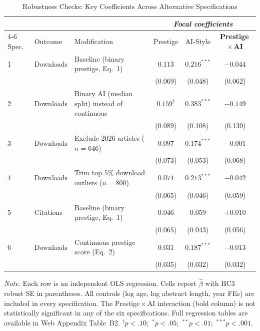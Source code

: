 \documentclass[12pt,a4paper]{article}
\begin{document}
\begin{table}[htbp]
\centering
\caption{Robustness Checks: Key Coefficients Across Alternative Specifications}
\label{tab:robustness}
\begin{threeparttable}
\small
\begin{tabular}{llp{4.2cm}ccc}
\toprule
 & & & \multicolumn{3}{c}{\textit{Focal coefficients}} \\
\cmidrule(lr){4-6}
Spec. & Outcome & Modification
  & Prestige & AI-Style & \textbf{Prestige\,$\times$\,AI} \\
\midrule
1 & Downloads & Baseline (binary prestige, Eq.~1)
  & $0.113$ & $0.216^{***}$  & $-0.044$ \\
  &           &
  & (0.069) & (0.048)        & (0.062)  \\[4pt]
2 & Downloads & Binary AI (median split) instead of continuous
  & $0.159^{\dagger}$ & $0.383^{***}$ & $-0.149$  \\
  &           &
  & (0.089)           & (0.108)       & (0.139)  \\[4pt]
3 & Downloads & Exclude 2026 articles ($n = 646$)
  & $0.097$ & $0.174^{***}$  & $-0.001$ \\
  &           &
  & (0.073) & (0.053)        & (0.068)  \\[4pt]
4 & Downloads & Trim top 5\% download outliers ($n=800$)
  & $0.074$ & $0.213^{***}$  & $-0.042$ \\
  &           &
  & (0.065) & (0.046)        & (0.059)  \\[4pt]
5 & Citations & Baseline (binary prestige, Eq.~1)
  & $0.046$  & $0.059$  & $+0.010$ \\
  &           &
  & (0.065)  & (0.043)  & (0.056)  \\[4pt]
6 & Downloads & Continuous prestige score (Eq.~2)
  & $0.031$ & $0.187^{***}$ & $-0.013$ \\
  &           &
  & (0.035) & (0.032)       & (0.032)  \\[4pt]
\bottomrule
\end{tabular}
\begin{tablenotes}
\footnotesize
\item \textit{Note.} Each row is an independent OLS regression.
  Cells report $\hat{\beta}$ with HC3 robust SE in parentheses.
  All controls (log age, log abstract length, year FEs)
  are included in every specification.
  The Prestige\,$\times$\,AI interaction (bold column) is not statistically
  significant in any of the six specifications.
  Full regression tables are available in Web Appendix Table~B2.
  $^{\dagger}p<.10$;\ $^{*}p<.05$;\ $^{**}p<.01$;\ $^{***}p<.001$.
\end{tablenotes}
\end{threeparttable}
\end{table}
\end{document}
